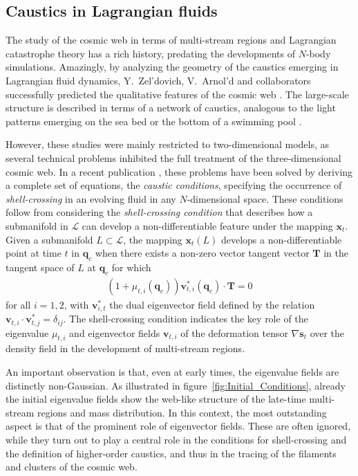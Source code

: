 \documentclass[a4paper, 11pt]{article}
\begin{document}
\subsection{Caustics in Lagrangian fluids}
The study of the cosmic web in terms of multi-stream regions and Lagrangian catastrophe theory has a rich history, predating the developments of $N$-body simulations. Amazingly, by analyzing the geometry of the caustics emerging in Lagrangian fluid dynamics, Y.\ Zel'dovich, V.\ Arnol'd and collaborators successfully predicted the qualitative features of the cosmic web \cite{Arnold:1982a, Arnold:1982b, Shandarin:1983, Rozhanskii:1984, Shandarin:1989}. The large-scale structure is described in terms of a network of caustics, analogous to the light patterns emerging on the sea bed or the bottom of a swimming pool \cite{Berry:1977, Berry:1980, Feldbrugge:2019}. 

However, these studies were mainly restricted to two-dimensional models, as several technical problems inhibited the full treatment of the three-dimensional cosmic web. In a recent publication \cite{Feldbrugge:2018}, these problems have been solved by deriving a complete set of equations, the {\it caustic conditions}, specifying the occurrence of \textit{shell-crossing} in an evolving fluid in any $N$-dimensional space. These conditions follow from considering the \textit{shell-crossing condition} that describes how a submanifold in $\mathcal{L}$ can develop a non-differentiable feature under the mapping $\bm{x}_t$. Given a submanifold $L \subset \mathcal{L}$, the mapping $\bm{x}_t(L)$ develops a non-differentiable point at time $t$ in $\bm{q}_c$ when there exists a non-zero vector tangent vector $\bm{T}$ in the tangent space of $L$ at $\bm{q}_c$ for which 
\begin{align}
(1+\mu_{t,i}(\bm{q}_c))\bm{v}_{t,i}^*(\bm{q}_c) \cdot \bm{T}=0
\label{eq:shellCrossingCondition}
\end{align}
for all $i=1,2$, with $\bm{v}_{i,t}^*$ the dual eigenvector field defined by the relation $\bm{v}_{t,i}\cdot \bm{v}_{t,j}^* = \delta_{ij}$. The shell-crossing condition indicates the key role of the eigenvalue $\mu_{t,i}$ and eigenvector fields $\bm{v}_{t,i}$ of the deformation tensor $\nabla \bm{s}_t$ over the density field in the development of multi-stream regions.

An important observation is that, even at early times, the eigenvalue fields are distinctly non-Gaussian. As illustrated in figure~\ref{fig:Initial_Conditions}, already the initial eigenvalue fields show the web-like structure of the late-time multi-stream regions and mass distribution. In this context, the most outstanding aspect is that of the prominent role of eigenvector fields. These are often ignored, while they turn out to play a central role in the conditions for shell-crossing and the definition of higher-order caustics, and thus in the tracing of the filaments and clusters of the cosmic web. 
\end{document}
